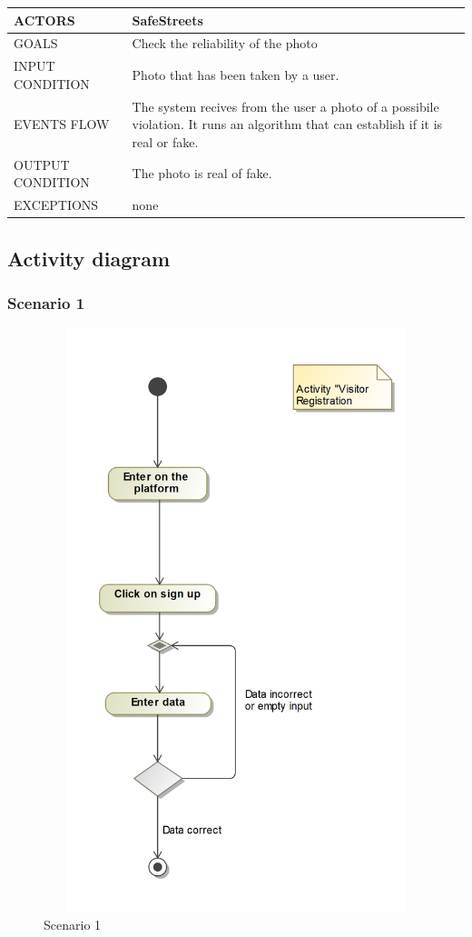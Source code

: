 \begin{center}
	\begin{tabular}{ | l | p{6cm} | } 
		\hline
		ACTORS & SafeStreets  \\ 
		\hline
		GOALS & Check the reliability of the photo  \\ 
		\hline
		INPUT CONDITION & Photo that has been taken by a user.  \\ 
		\hline
		EVENTS FLOW & The system recives from the user a photo of a possibile violation. It runs an algorithm that can establish if it is real or fake. \\ 
		\hline
		OUTPUT CONDITION & The photo is real of fake. \\ 
		\hline
		EXCEPTIONS & none \\ 
		\hline
	\end{tabular}
\end{center}

\newpage
\subsection{Activity diagram}
\subsubsection{Scenario 1}
\begin{figure}[H]
	\begin{minipage}[b]{0.40\textwidth}
		\includegraphics[width=12cm,height=17cm]{Images/ActivityRASD/Scenario1.png}
		\caption{Scenario 1}
	\end{minipage}
\end{figure}
\newpage
